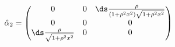 \begin{equation}
\hat{\alpha}_2 =\begin{pmatrix} 0 & 0 &\ds \frac{\rho}{(1+\rho^2x^2)\sqrt{1+\rho^2x^2}} \\ 0
& 0 & 0 \\\ds \frac{\rho}{\sqrt{1+\rho^2x^2}} & 0 & 0 \end{pmatrix}
\label{2.30B}
\end{equation}

